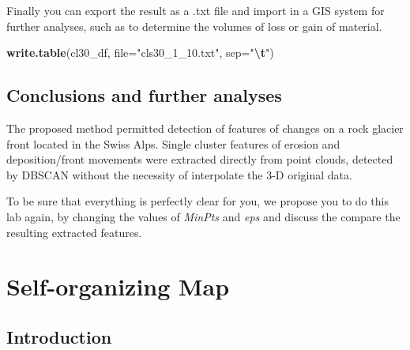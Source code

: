 \documentclass[
]{book}
\newenvironment{Shaded}{\begin{snugshade}}{\end{snugshade}}
\newcommand{\AttributeTok}[1]{\textcolor[rgb]{0.13,0.29,0.53}{#1}}
\newcommand{\CommentTok}[1]{\textcolor[rgb]{0.56,0.35,0.01}{\textit{#1}}}
\newcommand{\DecValTok}[1]{\textcolor[rgb]{0.00,0.00,0.81}{#1}}
\newcommand{\FunctionTok}[1]{\textcolor[rgb]{0.13,0.29,0.53}{\textbf{#1}}}
\newcommand{\NormalTok}[1]{#1}
\newcommand{\SpecialCharTok}[1]{\textcolor[rgb]{0.81,0.36,0.00}{\textbf{#1}}}
\newcommand{\StringTok}[1]{\textcolor[rgb]{0.31,0.60,0.02}{#1}}
\begin{document}
\begin{Shaded}
\end{Shaded}

Finally you can export the result as a .txt file and import in a GIS system for further analyses, such as to determine the volumes of loss or gain of material.

\begin{Shaded}
\begin{Highlighting}[]
\FunctionTok{write.table}\NormalTok{(cl30\_df, }\AttributeTok{file=}\StringTok{"cls30\_1\_10.txt"}\NormalTok{, }\AttributeTok{sep=}\StringTok{"}\SpecialCharTok{\textbackslash{}t}\StringTok{"}\NormalTok{)}
\end{Highlighting}
\end{Shaded}

\hypertarget{conclusions-and-further-analyses-2}{%
\section{Conclusions and further analyses}\label{conclusions-and-further-analyses-2}}

The proposed method permitted detection of features of changes on a rock glacier front located in the Swiss Alps.
Single cluster features of erosion and deposition/front movements were extracted directly from point clouds, detected by DBSCAN without the necessity of interpolate the 3-D original data.

To be sure that everything is perfectly clear for you, we propose you to do this lab again, by changing the values of \emph{MinPts} and \emph{eps} and discuss the compare the resulting extracted features.

\hypertarget{self-organizing-map}{%
\chapter{Self-organizing Map}\label{self-organizing-map}}

\hypertarget{introduction-3}{%
\section{Introduction}\label{introduction-3}}
\end{document}
